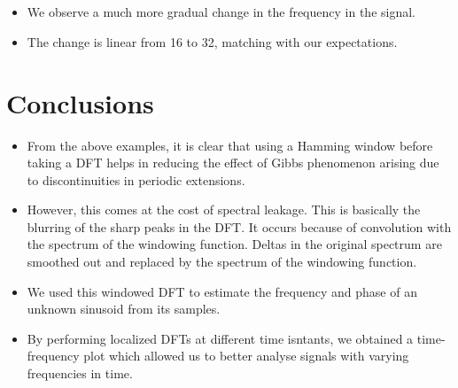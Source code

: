 \documentclass[11pt]{article}
\providecommand{\tightlist}{%
      \setlength{\itemsep}{0pt}\setlength{\parskip}{0pt}}
\begin{document}
	

    \begin{center}
    \end{center}
    { \hspace*{\fill} \\}
    
	

    \begin{center}
    \end{center}
    { \hspace*{\fill} \\}
    
	
		
    \begin{itemize}
\tightlist
\item
  We observe a much more gradual change in the frequency in the signal.
\item
  The change is linear from 16 to 32, matching with our expectations.
\end{itemize}

	

	
		
    \section{Conclusions}\label{conclusions}

\begin{itemize}
\tightlist
\item
  From the above examples, it is clear that using a Hamming window
  before taking a DFT helps in reducing the effect of Gibbs phenomenon
  arising due to discontinuities in periodic extensions.
\item
  However, this comes at the cost of spectral leakage. This is basically
  the blurring of the sharp peaks in the DFT. It occurs because of
  convolution with the spectrum of the windowing function. Deltas in the
  original spectrum are smoothed out and replaced by the spectrum of the
  windowing function.
\item
  We used this windowed DFT to estimate the frequency and phase of an
  unknown sinusoid from its samples.
\item
  By performing localized DFTs at different time isntants, we obtained a
  time-frequency plot which allowed us to better analyse signals with
  varying frequencies in time.
\end{itemize}

	


    
    
    
    
\end{document}
